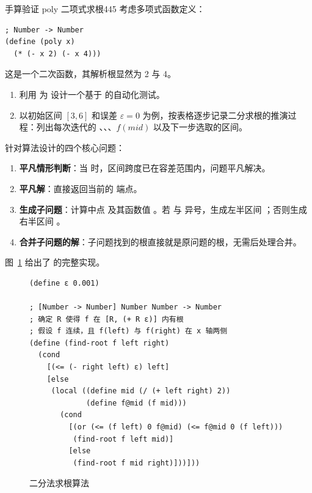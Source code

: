 \begin{exercise}{手算验证 poly 二项式求根}{445}\label{ex:445}
考虑多项式函数定义：
\begin{lstlisting}[language=BSL]
; Number -> Number
(define (poly x)
  (* (- x 2) (- x 4)))
\end{lstlisting}
这是一个二次函数，其解析根显然为 2 与 4。
\begin{enumerate}
  \item 利用  为  设计一个基于  的自动化测试。
  \item 以初始区间 $[3, 6]$ 和误差 $\varepsilon = 0$ 为例，按表格逐步记录二分求根的推演过程：列出每次迭代的 、、、$f(mid)$ 以及下一步选取的区间。
\end{enumerate}
\end{exercise}

针对算法设计的四个核心问题：
\begin{enumerate}
  \item \textbf{平凡情形判断}：当  时，区间跨度已在容差范围内，问题平凡解决。
  \item \textbf{平凡解}：直接返回当前的  端点。
  \item \textbf{生成子问题}：计算中点  及其函数值 。若  与  异号，生成左半区间 ；否则生成右半区间 。
  \item \textbf{合并子问题的解}：子问题找到的根直接就是原问题的根，无需后处理合并。
\end{enumerate}

图~\ref{fig:find-root-code} 给出了  的完整实现。

\begin{figure}[htbp]
  \centering
\begin{lstlisting}[language=BSL]
(define ε 0.001)

; [Number -> Number] Number Number -> Number
; 确定 R 使得 f 在 [R, (+ R ε)] 内有根
; 假设 f 连续，且 f(left) 与 f(right) 在 x 轴两侧
(define (find-root f left right)
  (cond
    [(<= (- right left) ε) left]
    [else
     (local ((define mid (/ (+ left right) 2))
             (define f@mid (f mid)))
       (cond
         [(or (<= (f left) 0 f@mid) (<= f@mid 0 (f left)))
          (find-root f left mid)]
         [else
          (find-root f mid right)]))]))
\end{lstlisting}
  \caption{二分法求根算法}
  \label{fig:find-root-code}
\end{figure}

